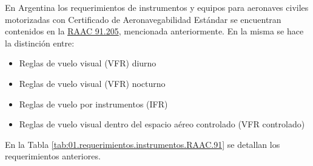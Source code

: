 En Argentina los requerimientos de instrumentos y equipos para aeronaves  civiles  motorizadas  con  Certificado de Aeronavegabilidad Estándar se encuentran contenidos en la \href{}{RAAC 91.205}, mencionada anteriormente.
En la misma se hace la distinci\'on entre:

\begin{itemize}
    \item Reglas de vuelo visual (VFR) diurno
    \item Reglas  de  vuelo  visual  (VFR)  nocturno
    \item Reglas de vuelo por instrumentos (IFR)
    \item Reglas de vuelo visual dentro del espacio aéreo controlado (VFR controlado)
\end{itemize}

En la Tabla \ref{tab:01.requerimientos.instrumentos.RAAC.91} se detallan los requerimientos anteriores.


\newpage

